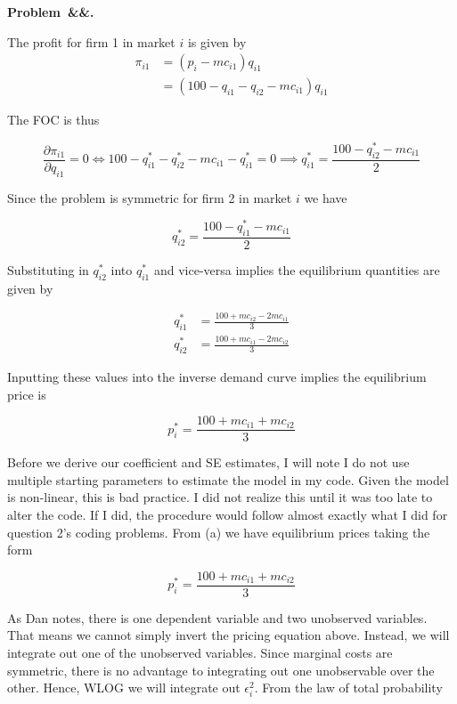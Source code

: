 \documentclass[12pt]{article}
\newcommand{\pd}[2]{\frac{\partial #1}{\partial #2}}  %
\newcounter{problem}
\newenvironment{problem}[1][]{
    \newpage %
    \refstepcounter{problem}\par\noindent
    \textbf{Problem~\theproblem\ifx&#1&\else.~#1\fi}\rmfamily\par\vspace{0.5em}
}{\vspace{1em}}
\begin{document}
\begin{problem}
    \begin{subproblems}
        \item The profit for firm 1 in market $i$ is given by
        \begin{align*}
            \pi_{i1} &= (p_i - mc_{i1})q_{i1} \\
            &= (100 - q_{i1} - q_{i2} - mc_{i1})q_{i1}
        \end{align*}

        The FOC is thus 

        $$\pd{\pi_{i1}}{q_{i1}} = 0 \iff 100 - q_{i1}^* - q_{i2}^* - mc_{i1} - q_{i1}^* = 0 \implies q_{i1}^* = \frac{100 - q_{i2}^* - mc_{i1}}{2}$$

        Since the problem is symmetric for firm 2 in market $i$ we have 

        $$q_{i2}^*=  \frac{100 - q_{i1}^* - mc_{i1}}{2}$$

        Substituting in $q_{i2}^*$ into $q_{i1}^*$ and vice-versa implies the equilibrium quantities are given by 

        \begin{align*}
            q_{i1}^* &= \frac{100 + mc_{i2} - 2mc_{i1}}{3} \\
            q_{i2}^* &= \frac{100 + mc_{i1} - 2mc_{i2}}{3}
        \end{align*}

        Inputting these values into the inverse demand curve implies the equilibrium price is 

        $$p_i^* = \frac{100 + mc_{i1} + mc_{i2}}{3}$$

        \item Before we derive our coefficient and SE estimates, I will note I do not use multiple starting parameters to estimate the model in my code. Given the model is non-linear, this is bad practice. I did not realize this until it was too late to alter the code. If I did, the procedure would follow almost exactly what I did for question 2's coding problems. From (a) we have equilibrium prices taking the form 
        
        $$p_i^* = \frac{100 + mc_{i1} + mc_{i2}}{3}$$

        As Dan notes, there is one dependent variable and two unobserved variables. That means we cannot simply invert the pricing equation above. Instead, we will integrate out one of the unobserved variables. Since marginal costs are symmetric, there is no advantage to integrating out one unobservable over the other. Hence, WLOG we will integrate out $\epsilon_{i}^2$. From the law of total probability 


\end{subproblems}
\end{problem}
\end{document}
